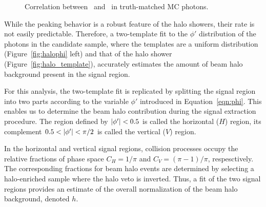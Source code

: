 \begin{figure}[htbp]
  \centering
  \caption{
    Correlation between \sieie\ and \emip\ in truth-matched MC photons. 
  }
  \label{fig:sieie_mip_corr}
\end{figure}

While the peaking behavior is a robust feature of the halo showers, their rate is not easily predictable. 
Therefore,  a two-template fit to the $\phi'$ distribution of the photons in the candidate sample, where the templates are a uniform distribution (Figure~\ref{fig:halophi} left) and that of the halo shower (Figure~\ref{fig:halo_template}), accurately estimates the amount of beam halo background present in the signal region.

For this analysis, the two-template fit is replicated by splitting the signal region into two parts according to the variable $\phi'$ introduced in Equation~\ref{eqn:phi}.
This enables us to determine the beam halo contribution during the signal extraction procedure.
The region defined by $\lvert \phi' \rvert < 0.5$ is called the horizontal ($H$) region, its complement $0.5 < \lvert \phi' \rvert < \pi/2$ is called the vertical ($V$) region.

In the horizontal and vertical signal regions, collision processes occupy the relative fractions of phase space $C_{H} = 1/\pi$ and $C_{V} = (\pi-1)/\pi$, respesctively. 
The corresponding fractions for beam halo events are determined by selecting a halo-enriched sample where the halo veto is inverted. 
Thus, a fit of the two signal regions provides an estimate of the overall normalization of the beam halo background, denoted $h$.
 
